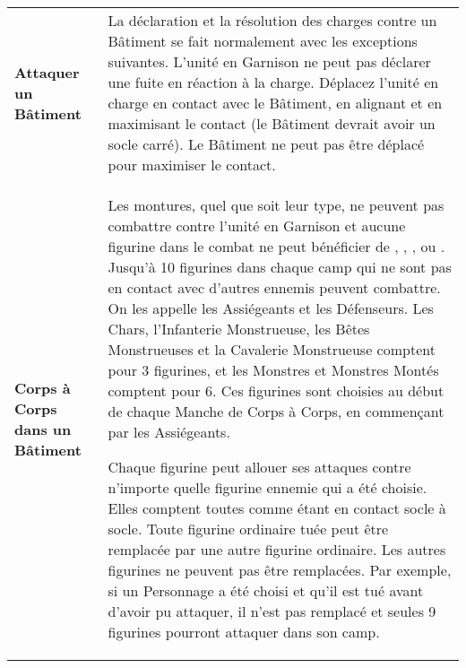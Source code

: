 \noindent\begin{tabular}{>{\bfseries\raggedleft}p{2.2cm}p{13.5cm}}
Attaquer un Bâtiment & La déclaration et la résolution des charges contre un Bâtiment se fait normalement avec les exceptions suivantes. L'unité en Garnison ne peut pas déclarer une fuite en réaction à la charge. Déplacez l'unité en charge en contact avec le Bâtiment, en alignant et en maximisant le contact (le Bâtiment devrait avoir un socle carré). Le Bâtiment ne peut pas être déplacé pour maximiser le contact. \tabularnewline
Corps à Corps dans un Bâtiment & Les montures, quel que soit leur type, ne peuvent pas combattre contre l'unité en Garnison et aucune figurine dans le combat ne peut bénéficier de \impacthits{}, \lance{}, \lightlance{}, \mountsprotection{} ou \barding{}. Jusqu'à 10 figurines dans chaque camp qui ne sont pas en contact avec d'autres ennemis peuvent combattre. On les appelle les Assiégeants et les Défenseurs. Les Chars, l'Infanterie Monstrueuse, les Bêtes Monstrueuses et la Cavalerie Monstrueuse comptent pour 3 figurines, et les Monstres et Monstres Montés comptent pour 6. Ces figurines sont choisies au début de chaque Manche de Corps à Corps, en commençant par les Assiégeants.

Chaque figurine peut allouer ses attaques contre n'importe quelle figurine ennemie qui a été choisie. Elles comptent toutes comme étant en contact socle à socle. Toute figurine ordinaire tuée peut être remplacée par une autre figurine ordinaire. Les autres figurines ne peuvent pas être remplacées. Par exemple, si un Personnage a été choisi et qu'il est tué avant d'avoir pu attaquer, il n'est pas remplacé et seules 9 figurines pourront attaquer dans son camp.


\end{tabular}
